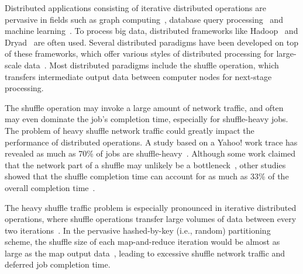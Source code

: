 \documentclass[10pt,journal,compsoc]{IEEEtran}
\begin{document}


Distributed applications consisting of iterative distributed operations
are pervasive in fields such as graph computing~\cite{Malewicz:2010:PSL,
Lu:2014:LDG}, database query
processing~\cite{thusoo2009hive,Yu:2008:DSG,Armbrust:2015:SSR} and
machine learning~\cite{low2012distributed,kraska2013mlbase}.
To process big data,
distributed frameworks like Hadoop~\cite{dean2008mapreduce}%
and Dryad~\cite{isard2007dryad} are often used.
Several distributed paradigms have been developed on top of
these frameworks, which offer various styles of distributed processing
for large-scale data~\cite{thusoo2009hive, Yu:2008:DSG,
zaharia2012resilient}.
Most distributed paradigms include the shuffle
operation, which transfers intermediate output data between computer nodes 
for next-stage processing.

The shuffle operation may invoke a large amount of network traffic, 
and often may even dominate the job's completion time, 
especially for shuffle-heavy jobs.
The problem of heavy shuffle network traffic could greatly impact the
performance of distributed operations.
A study based on a Yahoo! work trace has revealed as much as 70\% of 
jobs are shuffle-heavy~\cite{chen2011case}. 
Although some work claimed that the network part of a shuffle may
unlikely be a bottleneck~\cite{Ousterhout2015MSP},
other studies showed that the shuffle completion
time can account for as much as 33\% of the overall completion
time~\cite{chowdhury2011managing, al2010hedera}.

The heavy shuffle traffic problem is especially pronounced in 
iterative distributed operations, 
where shuffle operations transfer large volumes of data between every two iterations~\cite{zaharia2012resilient}. 
In the pervasive hashed-by-key (i.e., random) partitioning scheme, the
shuffle size of
each map-and-reduce iteration would be almost as large as the
map output data~\cite{dean2008mapreduce}, leading to excessive shuffle 
network traffic and deferred job completion time.
\end{document}
